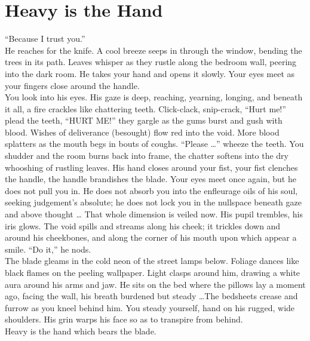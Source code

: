 \documentclass{antiquebook}
\begin{document}
    \frontmatter
    \titleRB
    \tableofcontents

    \mainmatter
    \pagestyle{fancy}

    \chapter{Heavy is the Hand}

    \indent “Because I trust you.” \\

\indent He reaches for the knife. A cool breeze seeps in through the window, bending the trees in its path. 
Leaves whisper as they rustle along the bedroom wall, peering into the dark room. He takes your hand and opens it slowly. 
Your eyes meet as your fingers close around the handle. \\

\indent You look into his eyes. His gaze is deep, reaching, yearning, longing, and beneath it all, a fire crackles like chattering teeth. 
Click-clack, snip-crack, “Hurt me!” plead the teeth, “HURT ME!” they gargle as the gums burst and gush with blood. 
Wishes of deliverance (besought) flow red into the void. More blood splatters as the mouth begs in bouts of coughs. 
“Please \dots ” wheeze the teeth. You shudder and the room burns back into frame, the chatter softens into the dry whooshing of rustling leaves. 
His hand closes around your fist, your fist clenches the handle, the handle brandishes the blade. 
Your eyes meet once again, but he does not pull you in. He does not absorb you into the enfleurage oils of his soul, 
seeking judgement's absolute; he does not lock you in the nullspace beneath gaze and above thought \dots 
That whole dimension is veiled now. His pupil trembles, his iris glows. The void spills and streams along his cheek; 
it trickles down and around his cheekbones, and along the corner of his mouth upon which appear a smile. “Do it,” he nods. \\

\indent The blade gleams in the cold neon of the street lamps below. Foliage dances like black flames on the peeling wallpaper. 
Light clasps around him, drawing a white aura around his arms and jaw. He sits on the bed where the pillows lay a moment ago, 
facing the wall, his breath burdened but steady \dots The bedsheets crease and furrow as you kneel behind him. 
You steady yourself, hand on his rugged, wide shoulders. His grin warps his face so as to transpire from behind. \\

\indent Heavy is the hand which bears the blade.
\end{document}
